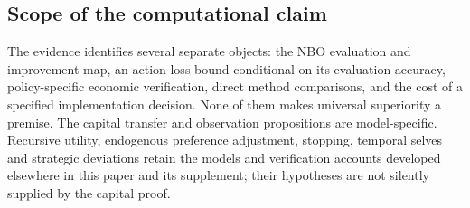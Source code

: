 \subsection{Scope of the computational claim}
The evidence identifies several separate objects: the NBO evaluation and improvement map, an action-loss bound conditional on its evaluation accuracy, policy-specific economic verification, direct method comparisons, and the cost of a specified implementation decision. None of them makes universal superiority a premise. The capital transfer and observation propositions are model-specific. Recursive utility, endogenous preference adjustment, stopping, temporal selves and strategic deviations retain the models and verification accounts developed elsewhere in this paper and its supplement; their hypotheses are not silently supplied by the capital proof.
